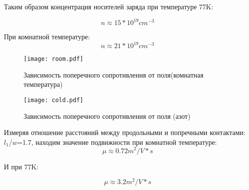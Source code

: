 Таким образом концентрация носителей заряда при температуре 77K:

$$n\approx15*10^{19}cm^{-3}$$ 

При комнатной температуре:
$$n\approx21*10^{19}cm^{-3}$$ 
\begin{figure}[H]
	\centering
	\texttt{[image: room.pdf]}
	\caption{Зависимость поперечного сопротивления от поля(комнатная температура)}
	\label{fig:room}
\end{figure}

\begin{figure}[H]
	\centering
	\texttt{[image: cold.pdf]}
	\caption{Зависимость поперечного  сопротивления от поля (азот)}
	\label{fig:cold}
\end{figure}

Измеряя отношение расстояний между продольными и попречными контактами: $l_1$/$w$=1.7, находим значение подвижности при комнатной температуре:
$$\mu\approx 0.72   m^2/V*s$$

И при 77K:

$$\mu\approx 3.2   m^2/V*s$$